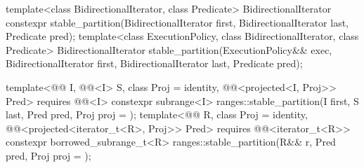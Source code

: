 %
\begin{itemdecl}
template<class BidirectionalIterator, class Predicate>
  BidirectionalIterator
    constexpr stable_partition(BidirectionalIterator first, BidirectionalIterator last,
                               Predicate pred);
template<class ExecutionPolicy, class BidirectionalIterator, class Predicate>
  BidirectionalIterator
    stable_partition(ExecutionPolicy&& exec,
                     BidirectionalIterator first, BidirectionalIterator last, Predicate pred);

template<@@ I, @@<I> S, class Proj = identity,
         @@<projected<I, Proj>> Pred>
  requires @@<I>
  constexpr subrange<I> ranges::stable_partition(I first, S last, Pred pred, Proj proj = {});
template<@@ R, class Proj = identity,
         @@<projected<iterator_t<R>, Proj>> Pred>
  requires @@<iterator_t<R>>
  constexpr borrowed_subrange_t<R> ranges::stable_partition(R&& r, Pred pred, Proj proj = {});
\end{itemdecl}

